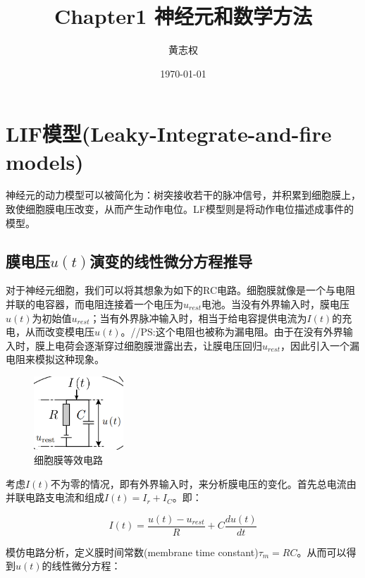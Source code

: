 \documentclass[12pt, a4paper, oneside]{ctexbook}
\title{{\Huge{\textbf{Chapter1 神经元和数学方法}}}}
\author{黄志权}
\date{\today}
\begin{document}
\maketitle

\setcounter{page}{1}

\newpage
{}
\setcounter{page}{1}
\tableofcontents
\newpage
\setcounter{page}{1}

\chapter{LIF模型(Leaky-Integrate-and-fire models)}
神经元的动力模型可以被简化为：树突接收若干的脉冲信号，并积累到细胞膜上，致使细胞膜电压改变，从而产生动作电位。LF模型则是将动作电位描述成事件的模型。

\section{膜电压$u(t)$演变的线性微分方程推导}
对于神经元细胞，我们可以将其想象为如下的RC电路。细胞膜就像是一个与电阻并联的电容器，而电阻连接着一个电压为$u_{rest}$电池。当没有外界输入时，膜电压$u(t)$为初始值$u_{rest}$；当有外界脉冲输入时，相当于给电容提供电流为$I(t)$的充电，从而改变模电压$u(t)$。//PS:这个电阻也被称为漏电阻。由于在没有外界输入时，膜上电荷会逐渐穿过细胞膜泄露出去，让膜电压回归$u_{rest}$，因此引入一个漏电阻来模拟这种现象。

\begin{figure}[H]
    \centering
    \includegraphics[width=0.3\textwidth]{细胞膜等效电路.png}
    \caption{细胞膜等效电路}
\end{figure} 

考虑$I(t)$不为零的情况，即有外界输入时，来分析膜电压的变化。首先总电流由并联电路支电流和组成$I(t)=I_r+I_C$。即：

\begin{equation}
I(t)=\frac{u(t)-u_{rest}}{R}+C\frac{du(t)}{dt}    
\end{equation}

模仿电路分析，定义膜时间常数(membrane time constant)$\tau _m=RC$。从而可以得到$u(t)$的线性微分方程：
\end{document}
